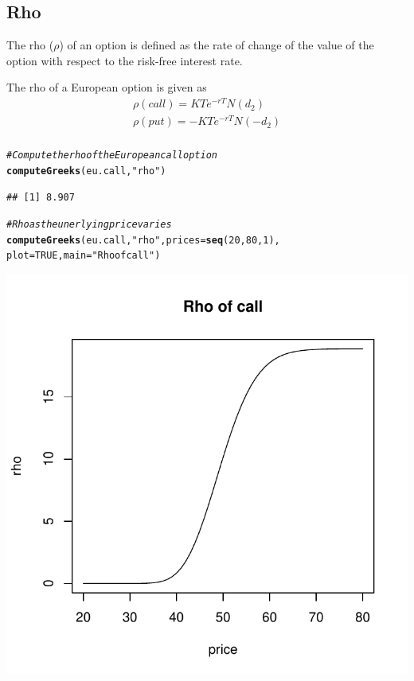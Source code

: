 \documentclass{article}\usepackage[]{graphicx}\usepackage[]{color}
\makeatletter
\def\maxwidth{ %
  \ifdim\Gin@nat@width>\linewidth
    \linewidth
  \else
    \Gin@nat@width
  \fi
}
\newcommand{\hlstr}[1]{\textcolor[rgb]{0.192,0.494,0.8}{#1}}%
\newcommand{\hlcom}[1]{\textcolor[rgb]{0.678,0.584,0.686}{\textit{#1}}}%
\newcommand{\hlkwd}[1]{\textcolor[rgb]{0.737,0.353,0.396}{\textbf{#1}}}%
\newenvironment{kframe}{%
 \def\at@end@of@kframe{}%
 \ifinner\ifhmode%
  \def\at@end@of@kframe{\end{minipage}}%
  \begin{minipage}{\columnwidth}%
 \fi\fi%
 \def\FrameCommand##1{\hskip\@totalleftmargin \hskip-\fboxsep
 \colorbox{shadecolor}{##1}\hskip-\fboxsep
     \hskip-\linewidth \hskip-\@totalleftmargin \hskip\columnwidth}%
 \MakeFramed {\advance\hsize-\width
   \@totalleftmargin\z@ \linewidth\hsize
   \@setminipage}}%
 {\par\unskip\endMakeFramed%
 \at@end@of@kframe}
\newenvironment{knitrout}{}{} %
\makeatother
\begin{document}
\subsection{Rho}
The rho ($\rho$) of an option is defined as the rate of change of the value of the option with respect to the risk-free interest rate.

The rho of a European option is given as
\begin{eqnarray*}
\rho (call) = K T e^{-r T} N(d_2)\\
\rho (put) = -K T e^{-r T} N(-d_2)\\
\end{eqnarray*}


\begin{knitrout}
\color{fgcolor}\begin{kframe}
\begin{alltt}
\hlcom{# Compute the rho of the European call option}
\hlkwd{computeGreeks}(eu.call, \hlstr{"rho"})
\end{alltt}
\begin{verbatim}
## [1] 8.907
\end{verbatim}
\end{kframe}
\end{knitrout}


\begin{knitrout}
\color{fgcolor}\begin{kframe}
\begin{alltt}
\hlcom{# Rho as the unerlying price varies}
\hlkwd{computeGreeks}(eu.call, \hlstr{"rho"}, prices = \hlkwd{seq}(20, 80, 1), 
              plot = TRUE, main=\hlstr{"Rho of call"})
\end{alltt}
\end{kframe}
\includegraphics[width=\maxwidth]{figure/unnamed-chunk-22} 

\end{knitrout}
\end{document}
